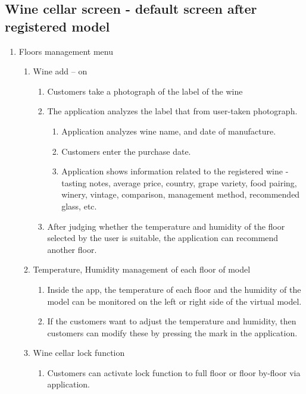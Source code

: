 \documentclass[conference]{IEEEtran}
\numberwithin{figure}{subsection}
\begin{document}
\subsection {\textbf{Wine cellar screen - default screen after registered model}}
\begin{enumerate}
    \item Floors management menu
    \begin{enumerate}
        \item Wine add – on
        \begin{enumerate}
            \item Customers take a photograph of the label of the wine
            \item The application analyzes the label that from user-taken
        	photograph.
            	\begin{enumerate}
                	\item Application analyzes wine name, and date of 
                    manufacture.
                    \item Customers enter the purchase date.
                    \item Application shows information related to the 
                    registered wine - tasting notes, average price, country,
                    grape variety, food pairing, winery, vintage,
                    comparison, management method, recommended
                    glass, etc.
            	\end{enumerate}
        	\item After judging whether the temperature and humidity of the floor selected by the user is suitable, the application can recommend another floor.
        \end{enumerate}
        \item Temperature, Humidity management of each floor of model
        \begin{enumerate}
            \item Inside the app, the temperature of each floor and the humidity of the model can be monitored on the left or right side of the virtual model.
            \item If the customers want to adjust the temperature and 	humidity, then customers can modify these by pressing 	the mark in the application.
        \end{enumerate}
        \item Wine cellar lock function
        \begin{enumerate}
            \item Customers can activate lock function to full floor or 	floor by-floor via application.

\end{enumerate}
\end{enumerate}
\end{enumerate}
\end{document}
